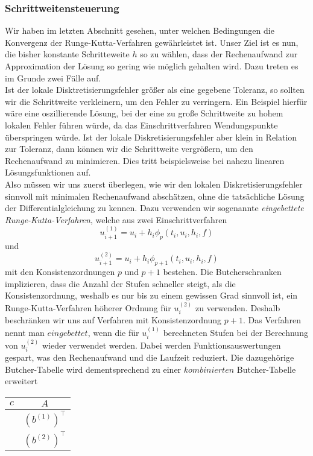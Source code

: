\subsubsection{Schrittweitensteuerung}
Wir haben im letzten Abschnitt gesehen, unter welchen Bedingungen die Konvergenz der Runge-Kutta-Verfahren
gewährleistet ist. Unser Ziel ist es nun, die bisher konstante Schritteweite $h$ so zu wählen, dass der Rechenaufwand
zur Approximation der Lösung so gering wie möglich gehalten wird. Dazu treten es im Grunde zwei Fälle auf.\\
Ist der lokale Disktretisierungsfehler größer als eine gegebene Toleranz, so sollten wir die Schrittweite verkleinern,
um den Fehler zu verringern. Ein Beispiel hierfür wäre eine oszillierende Lösung, bei der eine zu große Schrittweite
zu hohem lokalen Fehler führen würde, da das Einschrittverfahren Wendungspunkte überspringen würde.
Ist der lokale Diskretisierungsfehler aber klein in Relation zur Toleranz, dann können wir die Schrittweite
vergrößern, um den Rechenaufwand zu minimieren. Dies tritt beispielsweise bei nahezu linearen Lösungsfunktionen auf. \\
Also müssen wir uns zuerst überlegen, wie wir den lokalen Diskretisierungsfehler sinnvoll mit minimalen Rechenaufwand
abschätzen, ohne die tatsächliche Lösung der Differentialgleichung zu kennen. Dazu verwenden wir sogenannte
\textit{eingebettete Runge-Kutta-Verfahren}, welche aus zwei Einschrittverfahren
\[
    u_{i+1}^{(1)} = u_i + h_i \phi_{p}(t_i,u_i,h_i,f)
\]
und
\[
    u_{i+1}^{(2)} = u_i + h_i \phi_{p+1}(t_i,u_i,h_i,f)
\]
mit den Konsistenzordnungen $p$ und $p+1$ bestehen. Die Butcherschranken implizieren, dass die Anzahl
der Stufen schneller steigt, als die Konsistenzordnung, weshalb es nur bis zu einem gewissen Grad sinnvoll ist, ein
Runge-Kutta-Verfahren höherer Ordnung für $u_i^{(2)}$ zu verwenden. Deshalb beschränken wir uns auf Verfahren mit
Konsistenzordnung $p+1$.
Das Verfahren nennt man $eingebettet$, wenn die für $u_i^{(1)}$ berechneten Stufen bei der Berechnung von $u_i^{(2)}$
wieder verwendet werden. Dabei werden Funktionsauswertungen gespart, was den Rechenaufwand und die Laufzeit reduziert.
Die dazugehörige Butcher-Tabelle wird dementsprechend zu einer $kombinierten$ Butcher-Tabelle erweitert
\begin{center}
    \begin{tabular}{c | c}
        $c$ & $A$ \\
        \hline
        & $(b^{(1)})^{\intercal}$ \\
        \hline
        & $(b^{(2)})^{\intercal}$
    \end{tabular}
\end{center}
